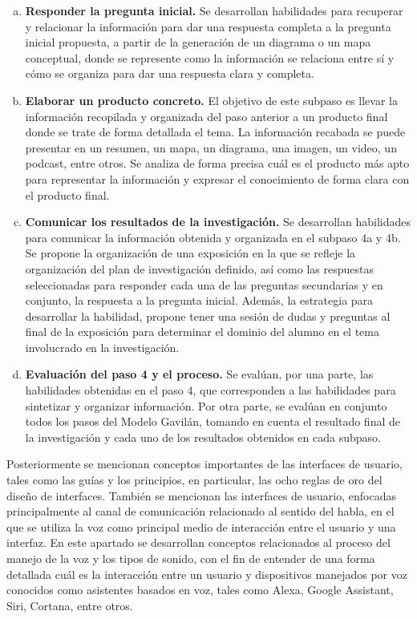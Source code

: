 \begin{enumerate}[a.]
  \item \textbf{Responder la pregunta inicial.} Se desarrollan habilidades para recuperar y relacionar la información para dar una respuesta completa a la pregunta inicial propuesta, a partir de la generación de un diagrama o un mapa conceptual, donde se represente como la información se relaciona entre sí y cómo se organiza para dar una respuesta clara y completa.
  \item \textbf{Elaborar un producto concreto.} El objetivo de este subpaso es llevar la información recopilada y organizada del paso anterior a un producto final donde se trate de forma detallada el tema. La información recabada se puede presentar en un resumen, un mapa, un diagrama, una imagen, un video, un podcast, entre otros. Se analiza de forma precisa cuál es el producto más apto para representar la información y expresar el conocimiento de forma clara con el producto final.
  \item \textbf{Comunicar los resultados de la investigación.} Se desarrollan habilidades para comunicar la información obtenida y organizada en el subpaso 4a y 4b. Se propone la organización de una exposición en la que se refleje la organización del plan de investigación definido, así como las respuestas seleccionadas para responder cada una de las preguntas secundarias y en conjunto, la respuesta a la pregunta inicial. Además, la estrategia para desarrollar la habilidad, propone tener una sesión de dudas y preguntas al final de la exposición para determinar el dominio del alumno en el tema involucrado en la investigación.
  \item \textbf{Evaluación del paso 4 y el proceso.} Se evalúan, por una parte, las habilidades obtenidas en el paso 4, que corresponden a las habilidades para sintetizar y organizar información. Por otra parte, se evalúan en conjunto todos los pasos del Modelo Gavilán, tomando en cuenta el resultado final de la investigación y cada uno de los resultados obtenidos en cada subpaso.
\end{enumerate}

Posteriormente se mencionan conceptos importantes de las interfaces de usuario, tales como las guías y los principios, en particular, las ocho reglas de oro del diseño de interfaces. También se mencionan las interfaces de usuario, enfocadas principalmente al canal de comunicación relacionado al sentido del habla, en el que se utiliza la voz como principal medio de interacción entre el usuario y una interfaz. En este apartado se desarrollan conceptos relacionados al proceso del manejo de la voz y los tipos de sonido, con el fin de entender de una forma detallada cuál es la interacción entre un usuario y dispositivos manejados por voz conocidos como asistentes basados en voz, tales como Alexa, Google Assistant, Siri, Cortana, entre otros.

